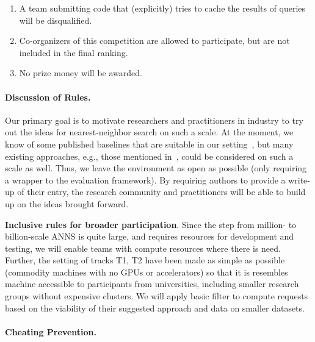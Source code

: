 \begin{enumerate}
  \item A team submitting code that (explicitly) tries to cache the results of queries will be disqualified.
  \item Co-organizers of this competition are allowed to participate, but are not included in the final ranking.
  \item No prize money will be awarded. 
\end{enumerate}



\paragraph{Discussion of Rules.}  
Our primary goal is to motivate researchers and practitioners in
industry to try out the ideas for nearest-neighbor search on such a
scale. At the moment, we know of some published baselines that are
suitable in our
setting~\cite{deep1b-link,babenko2014inverted,groh2019ggnn}, but many
existing approaches, e.g., those mentioned in~\cite{Benchmark}, could
be considered on such a scale as well. Thus, we leave the environment
as open as possible (only requiring a wrapper to the evaluation
framework).  By requiring authors to provide a write-up of their
entry, the research community and practitioners will be able to build
up on the ideas brought forward.

{\bf Inclusive rules for broader participation}. Since the step from
million- to billion-scale ANNS is quite large, and requires resources
for development and testing, we will enable teams with compute
resources where there is need. Further, the setting of tracks T1, T2
have been made as simple as possible (commodity machines with no GPUs
or accelerators) so that it is resembles machine accessible to
participants from universities, including smaller research groups
without expensive clusters.  We will apply basic filter to compute
requests based on the viability of their suggested approach and data
on smaller datasets.


\paragraph{Cheating Prevention.}

